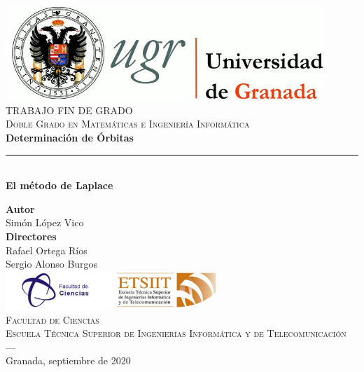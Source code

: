 \begin{titlepage}
 
 
\newlength{\centeroffset}
\setlength{\centeroffset}{-0.5\oddsidemargin}
\addtolength{\centeroffset}{0.5\evensidemargin}
\thispagestyle{empty}

\noindent\hspace*{\centeroffset}

\begin{minipage}{\textwidth}
	\centering
	\includegraphics[width=0.9\textwidth]{images/logo_ugr.jpg}\\[1.2cm]
	
	\textsc{\Large TRABAJO FIN DE GRADO\\[0.2cm]}
	\textsc{Doble Grado en Matemáticas e Ingeniería Informática}\\[0.8cm]
	{\Huge\bfseries Determinación de Órbitas\\
	}
	\noindent\rule[-1ex]{\textwidth}{1pt}\\[2.5ex]
	{\large\bfseries El método de Laplace}
\end{minipage}

\vspace{1cm}

\noindent\hspace*{\centeroffset}

\begin{minipage}{\textwidth}
	\centering
	\textbf{Autor}\\ {Simón López Vico}\\[2.5ex]
	\textbf{Directores}\\ {Rafael Ortega Ríos\\Sergio Alonso Burgos}\\[1.5cm]
	
	\includegraphics[width=0.3\textwidth]{images/logo_ciencias.png}
	\hspace{1.5cm}
	\includegraphics[width=0.3\textwidth]{images/logo_etsiit.png}\\[0.1cm]
	\textsc{Facultad de Ciencias\\Escuela Técnica Superior de Ingenierías Informática y de Telecomunicación}\\
	\textsc{---}\\
	Granada, septiembre de 2020
\end{minipage}
\end{titlepage}



